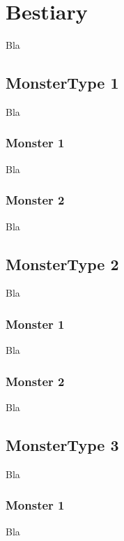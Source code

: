 \documentclass[a4paper,12pt]{book}
\begin{document}
\section{Bestiary}
Bla
\subsection{MonsterType 1}
Bla
\subsubsection{Monster 1}
Bla
\subsubsection{Monster 2}
Bla
\subsection{MonsterType 2}
Bla
\subsubsection{Monster 1}
Bla
\subsubsection{Monster 2}
Bla
\subsection{MonsterType 3}
Bla
\subsubsection{Monster 1}
Bla
\end{document}
